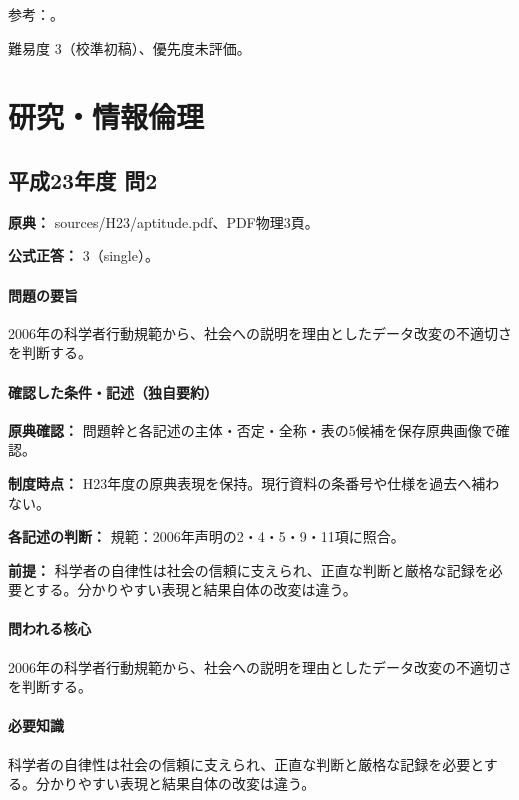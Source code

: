 \par 参考：\cite{singapore2010,scj_code2013}。

\par 難易度 3（校準初稿）、優先度未評価。

\section{研究・情報倫理}

\subsection{平成23年度 問2}
\label{q:h23-reg-apt-02}

\noindent\textbf{原典：} sources/H23/aptitude.pdf、PDF物理3頁。

\textbf{公式正答：} 3（single）。

\paragraph{問題の要旨} 2006年の科学者行動規範から、社会への説明を理由としたデータ改変の不適切さを判断する。

\paragraph{確認した条件・記述（独自要約）}\mbox{}\par

\noindent\textbf{原典確認：} 問題幹と各記述の主体・否定・全称・表の5候補を保存原典画像で確認。\par

\noindent\textbf{制度時点：} H23年度の原典表現を保持。現行資料の条番号や仕様を過去へ補わない。\par

\noindent\textbf{各記述の判断：} 規範：2006年声明の2・4・5・9・11項に照合。\par

\noindent\textbf{前提：} 科学者の自律性は社会の信頼に支えられ、正直な判断と厳格な記録を必要とする。分かりやすい表現と結果自体の改変は違う。\par

\paragraph{問われる核心} 2006年の科学者行動規範から、社会への説明を理由としたデータ改変の不適切さを判断する。

\paragraph{必要知識} 科学者の自律性は社会の信頼に支えられ、正直な判断と厳格な記録を必要とする。分かりやすい表現と結果自体の改変は違う。


